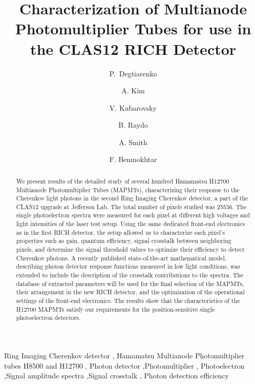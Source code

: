 \documentclass[5p,times,preprint]{elsarticle}
\begin{document}
\begin{frontmatter}
\title{Characterization of Multianode Photomultiplier Tubes for use in the CLAS12 RICH Detector}

\author[A]{P.~Degtiarenko }
\author[B]{A. Kim } 
\author[A]{V. Kubarovsky }
\author[A]{B. Raydo}
\author[C]{A. Smith}
\author[D]{F. Benmokhtar}



\address[A]{Thomas Jefferson National Accelerator Facility, Newport News, VA 23606, USA}
\address[B]{University of Connecticut, Storrs, CT 06269, USA}
\address[C]{Duke University, Durham, NC 27705, USA}
\address[D]{Duquesne University, Pittsburgh, PA, 15282, USA}



\begin{abstract}
We present results of the detailed study of several hundred Hamamatsu H12700 Multianode Photomultiplier Tubes (MAPMTs), characterizing their response to the Cherenkov light photons in the second Ring Imaging Cherenkov detector, a part of the CLAS12 upgrade at Jefferson Lab.
The total number of pixels studied was 25536.
The single photoelectron spectra were measured for each pixel at different high voltages and  light intensities of the laser test setup. Using the same dedicated front-end electronics as in the first RICH detector, the setup allowed us to characterize each pixel's properties such as gain, quantum efficiency, signal crosstalk between neighboring pixels,
and determine the signal threshold values to optimize their efficiency to detect Cherenkov photons.
A recently published state-of-the-art mathematical model, describing photon detector response functions measured in low light conditions, was extended to include the description of the crosstalk contributions to the spectra.
The database of extracted parameters will be used for the final selection of the MAPMTs, their arrangement in the new RICH detector, and the optimization of the operational settings of the front-end electronics.
The results show that the characteristics of the H12700 MAPMTs satisfy our requirements for the position-sensitive single photoelectron detectors.
\end{abstract}

\begin{keyword}
Ring Imaging Cherenkov detector \sep
Hamamatsu Multianode Photomultiplier tubes H8500 and H12700 \sep
Photon detector \sep Photomultiplier \sep
Photoelectron \sep  Signal amplitude spectra \sep Signal crosstalk \sep
Photon detection efficiency
\end{keyword}


\end{frontmatter}
\end{document}
